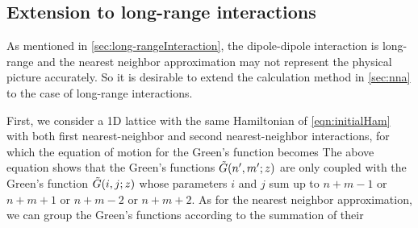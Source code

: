 \subsection{Extension to long-range interactions}
\label{sec:long-range}

As mentioned in \autoref{sec:long-rangeInteraction}, the dipole-dipole interaction is long-range and the nearest 
neighbor approximation may not represent the physical picture accurately. So it is desirable to extend the 
calculation method  in \autoref{sec:nna} to the case of long-range interactions. 

First, we consider a 1D lattice with the same Hamiltonian of \autoref{eqn:initialHam} with
both first nearest-neighbor and second nearest-neighbor interactions, 
for which the equation of motion for the Green's
function becomes
The above equation shows that the
Green's functions $\Tilde{G}(n^{\prime}, m^{\prime}; z)$ are only coupled with the Green's function 
$\Tilde{G}(i, j; z)$ whose parameters $i$ and $ j$ sum up to $n+m-1$ or $n+m+1$ or $n+m-2$ or $n+m+2$. As for the nearest neighbor approximation, we can group the Green's functions according to the summation of their 
